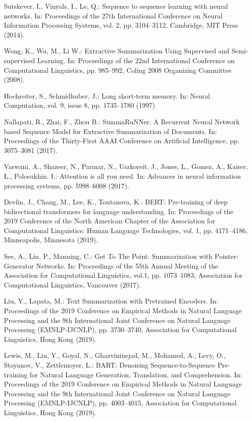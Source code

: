 \documentclass[runningheads]{llncs}
\begin{document}
\begin{thebibliography}{8}
Sutskever, I., Vinyals, I., Le, Q.: Sequence to sequence learning with neural networks. In: Proceedings of the 27th International Conference
on Neural Information Processing Systems, vol. 2, pp. 3104–3112, Cambridge, MIT Press (2014).

Wong, K., Wu, M., Li W.: Extractive Summarization Using Supervised and Semi-supervised Learning. In: Proceedings of the 22nd International Conference on Computational Linguistics, pp. 985–992, Coling 2008 Organizing Committee (2008).

Hochreiter, S., Schmidhuber, J.: Long short-term memory. In: Neural Computation, vol. 9, issue 8, pp. 1735–1780 (1997)

Nallapati, R., Zhai, F., Zhou B.: SummaRuNNer: A Recurrent Neural Network based Sequence Model for Extractive Summarization of Documents. In: Proceedings of the Thirty-First AAAI Conference on Artificial Intelligence, pp. 3075–3081 (2017).

Vaswani, A., Shazeer, N., Parmar, N., Uszkoreit, J., Jones, L., Gomez, A., Kaiser, Ł., Polosukhin. I.: Attention is all you need. In: Advances in neural information processing systems, pp. 5998–6008 (2017).

Devlin, J., Chang, M., Lee, K., Toutanova, K.: BERT: Pre-training of
deep bidirectional transformers for language understanding. In: Proceedings of the 2019 Conference of the North American Chapter of the Association for
Computational Linguistics: Human Language Technologies, vol. 1, pp. 4171–4186, Minneapolis, Minnesota (2019).

See, A., Liu, P., Manning, C.: Get To The Point: Summarization with Pointer-Generator Networks. In: Proceedings of the 55th Annual Meeting of the Association for Computational Linguistics, vol.1, pp. 1073–1083, Association for Computational Linguistics, Vancouver (2017).

Liu, Y., Lapata, M.: Text Summarization with Pretrained Encoders. In: Proceedings of the 2019 Conference on Empirical Methods in Natural Language Processing and the 9th International Joint Conference on Natural Language Processing (EMNLP-IJCNLP), pp. 3730–3740, Association for Computational Linguistics, Hong Kong (2019).

Lewis, M., Liu, Y., Goyal, N., Ghazvininejad, M., Mohamed, A., Levy, O., Stoyanov, V., Zettlemoyer, L.: BART: Denoising Sequence-to-Sequence Pre-training for Natural Language Generation, Translation, and Comprehension. In: Proceedings of the 2019 Conference on Empirical Methods in Natural Language Processing and the 9th International Joint Conference on Natural Language Processing (EMNLP-IJCNLP), pp. 4003–4015, Association for Computational Linguistics, Hong Kong (2019).


\end{thebibliography}
\end{document}
